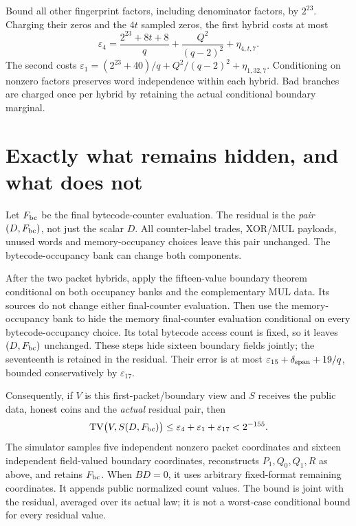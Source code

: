 \documentclass[11pt]{article}
\begin{document}
Bound all other fingerprint factors, including denominator factors, by $2^{23}$. Charging their zeros and the $4t$ sampled zeros, the first hybrid costs at most
\[
 \varepsilon_4=\frac{2^{23}+8t+8}{q}+\frac{Q^2}{(q-2)^2}+\eta_{4,t,7}.
\]
The second costs $\varepsilon_1=(2^{23}+40)/q+Q^2/(q-2)^2+\eta_{1,32,7}$. Conditioning on nonzero factors preserves word independence within each hybrid. Bad branches are charged once per hybrid by retaining the actual conditional boundary marginal.

\section{Exactly what remains hidden, and what does not}

Let $F_{\rm bc}$ be the final bytecode-counter evaluation. The residual is the \emph{pair} $(D,F_{\rm bc})$, not just the scalar $D$. All counter-label trades, XOR/MUL payloads, unused words and memory-occupancy choices leave this pair unchanged. The bytecode-occupancy bank can change both components.

After the two packet hybrids, apply the fifteen-value boundary theorem conditional on both occupancy banks and the complementary MUL data. Its sources do not change either final-counter evaluation. Then use the memory-occupancy bank to hide the memory final-counter evaluation conditional on every bytecode-occupancy choice. Its total bytecode access count is fixed, so it leaves $(D,F_{\rm bc})$ unchanged. These steps hide sixteen boundary fields jointly; the seventeenth is retained in the residual. Their error is at most $\varepsilon_{15}+\delta_{\rm span}+19/q$, bounded conservatively by $\varepsilon_{17}$.

Consequently, if $V$ is this first-packet/boundary view and $S$ receives the public data, honest coins and the \emph{actual} residual pair, then
\[
 \operatorname{TV}\bigl(V,S(D,F_{\rm bc})\bigr)
 \le \varepsilon_4+\varepsilon_1+\varepsilon_{17}<2^{-155}.
\]
The simulator samples five independent nonzero packet coordinates and sixteen independent field-valued boundary coordinates, reconstructs $P_1,Q_0,Q_1,R$ as above, and retains $F_{\rm bc}$. When $BD=0$, it uses arbitrary fixed-format remaining coordinates. It appends public normalized count values. The bound is joint with the residual, averaged over its actual law; it is not a worst-case conditional bound for every residual value.
\end{document}

